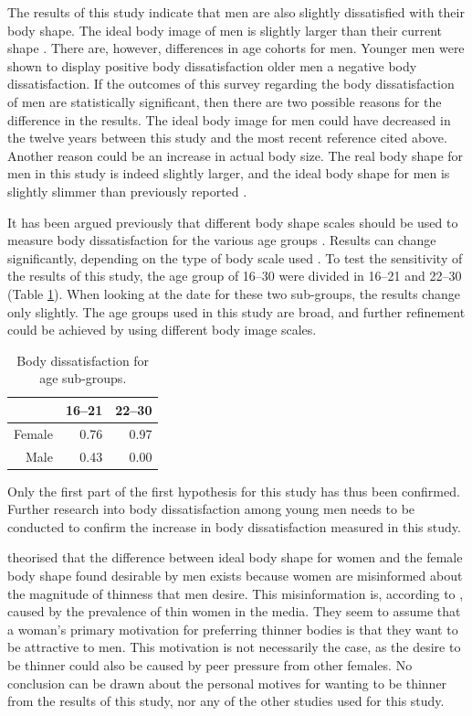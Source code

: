 \documentclass[a4paper, jou, 11pt]{apa6}
\begin{document}
The results of this study indicate that men are also slightly dissatisfied with their body shape. The ideal body image of men is slightly larger than their current shape \cite{fallon_sex_1985,tiggeman_body-size_1992}. There are, however, differences in age cohorts for men. Younger men were shown to display positive body dissatisfaction older men a negative body dissatisfaction. If the outcomes of this survey regarding the body dissatisfaction of men are statistically significant, then there are two possible reasons for the difference in the results. The ideal body image for men could have decreased in the twelve years between this study and the most recent reference cited above. Another reason could be an increase in actual body size. The real body shape for men in this study is indeed slightly larger, and the ideal body shape for men is slightly slimmer than previously reported \cite{lamb_body_1993}.

It has been argued previously that different body shape scales should be used to measure body dissatisfaction for the various age groups \cite{byrne_should_1996}. Results can change significantly, depending on the type of body scale used \cite{tiggeman_body-size_1992}. To test the sensitivity of the results of this study, the age group of 16--30 were divided in 16--21 and 22--30 (Table \ref{age2}). When looking at the date for these two sub-groups, the results change only slightly. The age groups used in this study are broad, and further refinement could be achieved by using different body image scales.

\begin{table}[ht]
\centering
\begin{tabular}{rrr}
  \hline
 & 16--21 & 22--30 \\ 
  \hline
Female & 0.76 & 0.97 \\ 
  Male & 0.43 & 0.00 \\ 
   \hline
\end{tabular}
\caption{Body dissatisfaction for age sub-groups.} 
\label{age2}
\end{table}

Only the first part of the first hypothesis for this study has thus been confirmed. Further research into body dissatisfaction among young men needs to be conducted to confirm the increase in body dissatisfaction measured in this study.

 theorised that the difference between ideal body shape for women and the female body shape found desirable by men exists because women are misinformed about the magnitude of thinness that men desire. This misinformation is, according to , caused by the prevalence of thin women in the media. They seem to assume that a woman's primary motivation for preferring thinner bodies is that they want to be attractive to men. This motivation is not necessarily the case, as the desire to be thinner could also be caused by peer pressure from other females. No conclusion can be drawn about the personal motives for wanting to be thinner from the results of this study, nor any of the other studies used for this study.
\end{document}
